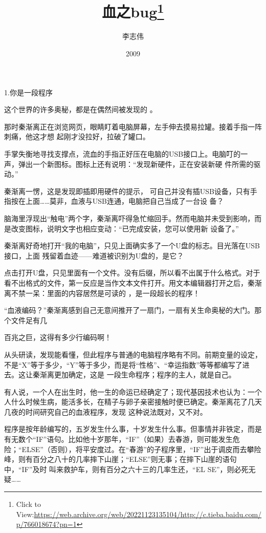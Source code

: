 \documentclass{article}
\title{血之bug\footnote{Click to View:\url{https://web.archive.org/web/20221123135104/http://c.tieba.baidu.com/p/766018674?pn=1}}}
\author{李志伟}
\date{2009}
\begin{document}

\maketitle


\Large


﻿1.你是一段程序 

这个世界的许多奥秘，都是在偶然间被发现的
。 

那时秦渐离正在浏览网页，眼睛盯着电脑屏幕，左手伸去摸易拉罐。接着手指一阵刺痛，他这才想
起刚才没拉好，拉破了罐口。 

手掌失衡地寻找支撑点，流血的手指正好压在电脑的USB接口上。电脑叮的一声，弹出一个新图标。图标上还有说明：“发现新硬件，正在安装新硬
件所需的驱动。” 

秦渐离一愣，这是发现即插即用硬件的提示，
\newpage
可自己并没有插USB设备，只有手指按在上面……莫非，血液与USB连通，电脑把自己当成了一台设
备？ 

脑海里浮现出“触电”两个字，秦渐离吓得急忙缩回手。然而电脑并未受到影响，而是改变图标，说明文字也相应变动：“已完成安装，您可以使用新
设备了。” 

秦渐离好奇地打开“我的电脑”，只见上面确实多了一个U盘的标志。目光落在USB接口，上面
残留着血迹——难道被识别为U盘的，是它？ 

点击打开U盘，只见里面有一个文件。没有后缀，所以看不出属于什么格式。对于看不出格式的文件，第一反应是当作文本文件打开。用文本编辑器打开之后，秦渐离不禁一呆：里面的内容居然是可读的
，是一段超长的程序！ 

“血液编码？”秦渐离感到自己无意间推开了一扇门，一扇有关生命奥秘的大门。那个文件足有几
\newpage

百兆之巨，这得有多少行编码啊！ 

从头研读，发现能看懂，但此程序与普通的电脑程序略有不同。前期变量的设定，不是“X”等于多少，“Y”等于多少，而是将“性格”、“幸运指数”等等都编写了进去。这让秦渐离更加确定，这是
一段生命程序；程序的主人，就是自己。 

有人说，一个人在出生时，他一生的命运已经确定了；现代基因技术也认为：一个人什么时候生病，能活多长，在精子与卵子亲密接触时便已确定。秦渐离花了几天几夜的时间研究自己的血液程序，发现
这种说法既对，又不对。 

程序是按年龄编写的，五岁发生什么事，十岁发生什么事。但事情并非铁定，而是有无数个“IF”语句。比如他十岁那年，“IF”（如果）去春游，则可能发生危险；“ELSE”（否则），将平安度过。在“春游”的子程序里，“IF”出于调皮而去攀险峰，则有百分之八十的几率摔下山崖；“ELSE”则无事；在摔下山崖的语句中，“IF”及时
\newpage
叫来救护车，则有百分之六十三的几率生还，“EL
SE”，则必死无疑…… 
\end{document}
